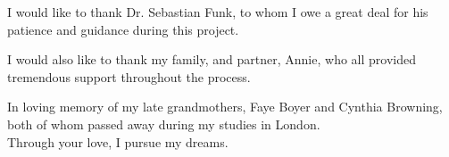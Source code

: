 \documentclass[../Paper.tex]{subfiles}
\begin{document}
  \justifying
  I would like to thank Dr. Sebastian Funk, to whom I owe a great deal for his
  patience and guidance during this project.

  I would also like to thank my family, and partner, Annie, who all provided
  tremendous support throughout the process.

  In loving memory of my late grandmothers, Faye Boyer and Cynthia Browning, both
  of whom passed away during my studies in London. \\
  Through your love, I pursue my dreams.
  \clearpage
\end{document}
